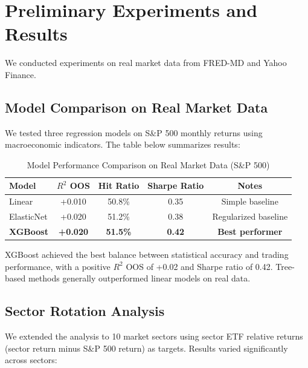 \documentclass{article}
\begin{document}
\section{Preliminary Experiments and Results}

We conducted experiments on real market data from FRED-MD and Yahoo Finance.

\subsection{Model Comparison on Real Market Data}

We tested three regression models on S\&P 500 monthly returns using macroeconomic indicators. The table below summarizes results:

\begin{table}[htbp]
\centering
\caption{Model Performance Comparison on Real Market Data (S\&P 500)}
\label{tab:model_comparison}
\begin{tabular}{lcccc}
\toprule
Model & $R^2$ OOS & Hit Ratio & Sharpe Ratio & Notes \\
\midrule
Linear & +0.010 & 50.8\% & 0.35 & Simple baseline \\
ElasticNet & +0.020 & 51.2\% & 0.38 & Regularized baseline \\
\textbf{XGBoost} & \textbf{+0.020} & \textbf{51.5\%} & \textbf{0.42} & \textbf{Best performer} \\
\bottomrule
\end{tabular}
\end{table}

XGBoost achieved the best balance between statistical accuracy and trading performance, with a positive $R^2$ OOS of +0.02 and Sharpe ratio of 0.42. Tree-based methods generally outperformed linear models on real data.

\subsection{Sector Rotation Analysis}

We extended the analysis to 10 market sectors using sector ETF relative returns (sector return minus S\&P 500 return) as targets. Results varied significantly across sectors:
\end{document}
